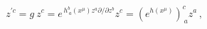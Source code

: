 \begin{equation}\label{linear} z^{\prime c}=g~ z^c =e^{\,
h^b_{~a}(x^{\mu})z^a\partial/\partial z^b} z^c = \left(
e^{h(x^{\mu})}\right)^c_{~a} z^a\, , 
\end{equation} 
